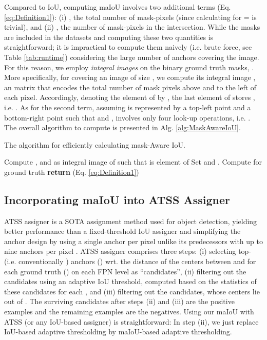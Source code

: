 \documentclass{bmvc2k}
\begin{document}
Compared to IoU, computing maIoU involves two additional terms (Eq. \ref{eq:Definition1}):  (i) , the total number of mask-pixels (since calculating  for = is trivial), and (ii) , the number of mask-pixels in the intersection. While the masks are included in the datasets and computing these two quantities is straightforward; it is impractical to compute them naively (i.e. brute force, see Table \ref{tab:runtime}) considering the large number of anchors covering the image. For this reason, we employ \textit{integral images} \cite{IntegralImage} on the binary ground truth masks, . More specifically, for  covering an image of size , we compute its integral image , an  matrix that encodes the total number of mask pixels above and to the left of each pixel. Accordingly, denoting the  element of  by , the last element of  stores , i.e. . As for the second term, assuming  is represented by a top-left point  and a bottom-right point  such that  and ,  involves only four look-up operations, i.e. . The overall algorithm to compute  is presented in Alg. \ref{alg:MaskAwareIoU}.
\begin{algorithm}
\caption{The algorithm for efficiently calculating mask-Aware IoU. \label{alg:MaskAwareIoU}}
\small
\begin{algorithmic}[1]
\State Compute ,  and  as integral image of  such that  is  element of  
\State Set  and .
\State Compute  for ground truth 
\State \textbf{return}  (Eq. \ref{eq:Definition1})
\EndProcedure
\end{algorithmic}
\end{algorithm}






\subsection{Incorporating maIoU into ATSS Assigner}
\label{subsec:ATSS}
ATSS assigner \cite{ATSS} is a SOTA assignment method used for object detection, yielding better performance than a fixed-threshold IoU assigner and simplifying the anchor design by using a single anchor per pixel unlike its predecessors with up to nine anchors per pixel \cite{FocalLoss}. ATSS assigner comprises three steps: (i) selecting top- (i.e. conventionally ) anchors () wrt. the distance of the centers between  and  for each ground truth () on each FPN level as ``candidates'', (ii) filtering out the candidates using an adaptive IoU threshold, computed based on the statistics of these candidates for each , and (iii) filtering out the candidates, whose centers lie out of . The surviving candidates after steps (ii) and (iii) are the positive examples and the remaining examples are the negatives. Using our maIoU with ATSS (or any IoU-based assigner) is straightforward: In step (ii), we just replace IoU-based adaptive thresholding by maIoU-based adaptive thresholding.
\end{document}
